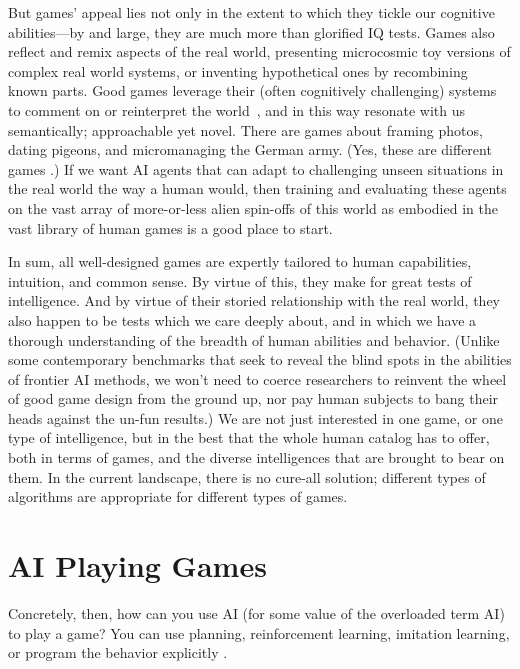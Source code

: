 \documentclass[runningheads]{llncs}
\begin{document}
But games' appeal lies not only in the extent to which they tickle our cognitive abilities---by and large, they are much more than glorified IQ tests. Games also reflect and remix aspects of the real world, presenting microcosmic toy versions of complex real world systems, or inventing hypothetical ones by recombining known parts. Good games leverage their (often cognitively challenging) systems to comment on or reinterpret the world~\cite{bogost2008rhetoric}, and in this way resonate with us semantically; approachable yet novel. There are games about framing photos, dating pigeons, and micromanaging the German army. (Yes, these are different games \cite{umurangi_generation,hatoful_boyfriend,hearts_of_iron_iv}.)
If we want AI agents that can adapt to challenging unseen situations in the real world the way a human would, then training and evaluating these agents on the vast array of more-or-less alien spin-offs of this world as embodied in the vast library of human games is a good place to start.

In sum, all well-designed games are expertly tailored to human capabilities, intuition, and common sense. By virtue of this, they make for great tests of intelligence. And by virtue of their storied relationship with the real world, they also happen to be tests which we care deeply about, and in which we have a thorough understanding of the breadth of human abilities and behavior.
(Unlike some contemporary benchmarks that seek to reveal the blind spots in the abilities of frontier AI methods, we won't need to coerce researchers to reinvent the wheel of good game design from the ground up, nor pay human subjects to bang their heads against the un-fun results.)
We are not just interested in one game, or one type of intelligence, but in the best that the whole human catalog has to offer, both in terms of games, and the diverse intelligences that are brought to bear on them.
In the current landscape, there is no cure-all solution; different types of algorithms are appropriate for different types of games.

\section{AI Playing Games}

Concretely, then, how can you use AI (for some value of the overloaded term AI) to play a game? You can use planning, reinforcement learning, imitation learning, or program the behavior explicitly \cite{yannakakis2025artificial}.
\end{document}
